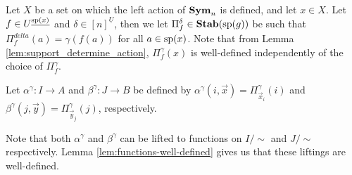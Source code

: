 \documentclass[../paper.tex]{subfiles}
\begin{document}




Let $X$ be a set on which the left action of $\text{\textbf{Sym}}_n$ is defined, and let $x \in
X$. Let $f \in U^{\underline{\text{sp}(x)}}$ and $\delta \in [n]^{\underline{U}}$,
then we let $\Pi^{\delta}_{f} \in \text{\textbf{Stab}} (\text{sp} (g))$ be such that $\Pi^{delta}_f (a) =
\gamma (f(a))$ for all $a \in \text{sp}(x)$. Note that from Lemma
\ref{lem:support_determine_action}, $\Pi^{\gamma}_f(x)$ is well-defined
independently of the choice of $\Pi^{\gamma}_f$.

Let $\alpha^{\gamma}: I \rightarrow A$ and $\beta^{\gamma}: J \rightarrow B$ be
defined by $\alpha^{\gamma} (i, \vec{x}) = \Pi^{\gamma}_{\vec{x}_{i}}(i)$ and
$\beta^{\gamma} (j, \vec{y}) = \Pi^{\gamma}_{\vec{y}_{j}}(j)$, respectively.

Note that both $\alpha^{\gamma}$ and $\beta^{\gamma}$ can be lifted to functions
on $I /{\sim}$ and $J /{\sim}$ respectively. Lemma
\ref{lem:functions-well-defined} gives us that these liftings are well-defined.
\end{document}
